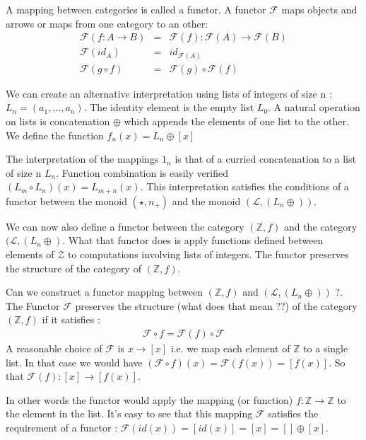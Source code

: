 \documentclass[12pt,fleqn]{article}
\begin{document}
A mapping between categories is called a functor. 
A functor $\mathcal{F}$ maps objects and arrows or maps from one category to an other:
\begin{eqnarray*}
\mathcal{F} (f : A \rightarrow B) &=& \mathcal{F}(f) : \mathcal{F}(A) \rightarrow \mathcal{F}(B) \\
\mathcal{F}(id_A) &=& id_{\mathcal{F}(A)} \\
\mathcal{F}(g \circ f) &=& \mathcal{F}(g) \circ \mathcal{F}(f)
\end{eqnarray*}


We can create an alternative interpretation using lists of integers of size n : $L_{n} = (a_1,...,a_{n})$. 
The identity element is the empty list $L_0$.
A natural operation on lists is concatenation $\oplus$ which appends the elements of one list to the other.
We define the function $f_{n} (x) = L_{n} \oplus [x]$

The interpretation of the mappings $1_n$ is that of a curried concatenation to a list of size n $L_{n}$.
Function combination is easily verified $(L_m \circ L_n)(x) = L_{m+n} (x)$.
This interpretation satisfies the conditions of a functor between the monoid $(\star, n_+)$ and the monoid $(\mathcal{L},(L_n \oplus ))$.

We can now also define a functor between the category $(\mathbb{Z}, f)$ and the category $(\mathcal{L}, (L_n \oplus)$.
What that functor does is apply functions defined between elements of $\mathcal{Z}$ to computations involving lists of integers.
The functor preserves the structure of the category of $(\mathbb{Z}, f)$.

Can we construct a functor mapping between $(\mathbb{Z}, f)$ and $(\mathcal{L}, (L_n \oplus ))$ ?.
The Functor $\mathcal{F}$ preserves the structure (what does that mean ??) of the category $(\mathbb{Z}, f)$ if it satisfies :
\begin{eqnarray*}
\mathcal{F} \circ f = \mathcal{F}(f) \circ \mathcal{F} 
\end{eqnarray*}
A reasonable choice of $\mathcal{F}$ is $x \rightarrow [x]$ i.e. we map each element of $\mathbb{Z}$ to a single list.
In that case we would have $(\mathcal{F} \circ f)(x) = \mathcal{F}(f(x)) = [f(x)]$.
So that $\mathcal{F}(f) : [x] \rightarrow [f(x)]$.

In other words the functor would apply the mapping (or function) $f : \mathbb{Z} \rightarrow \mathbb{Z}$ to the element in the list.
It's easy to see that this mapping $\mathcal{F}$ satisfies the requirement of a functor : $\mathcal{F} (id(x)) = [id(x)] = [x] = [] \oplus [x]$.
\end{document}
